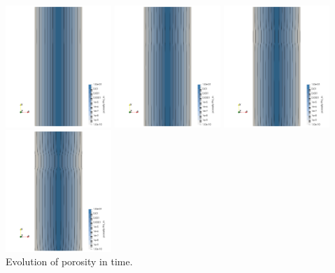 \begin{center}
\includegraphics[width=4cm]{python_codes/fieldstone_126/results/model3/nelx32/phi_1.png}
\includegraphics[width=4cm]{python_codes/fieldstone_126/results/model3/nelx32/phi_2.png}
\includegraphics[width=4cm]{python_codes/fieldstone_126/results/model3/nelx32/phi_3.png}
\includegraphics[width=4cm]{python_codes/fieldstone_126/results/model3/nelx32/phi_4.png}\\
{\captionfont Evolution of porosity in time.}
\end{center}






\newpage
